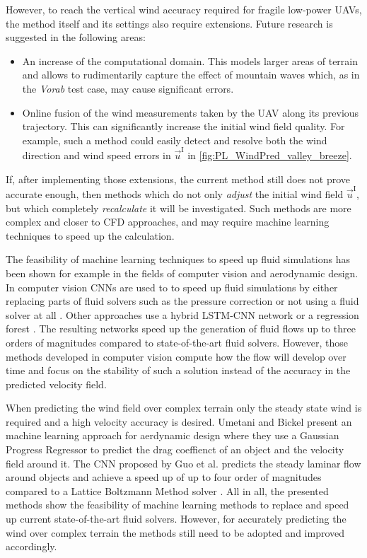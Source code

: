 \documentclass[twocolumn,letterpaper]{IEEEAerospaceCLS}
\begin{document}
However, to reach the vertical wind accuracy required for fragile low-power UAVs, the method itself and its settings also require extensions. Future research is suggested in the following areas: 
\begin{itemize}
\item An increase of the computational domain. This models larger areas of terrain and allows to rudimentarily capture the effect of mountain waves which, as in the \emph{Vorab} test case, may cause significant errors.
\item Online fusion of the wind measurements taken by the UAV along its previous trajectory. This can significantly increase the initial wind field quality. For example, such a method could easily detect and resolve both the wind direction and wind speed errors in $\vec{u}^\text{I}$ in \cref{fig:PL_WindPred_valley_breeze}.
\end{itemize}

If, after implementing those extensions, the current method still does not prove accurate enough, then methods which do not only \emph{adjust} the initial wind field $\vec{u}^\text{I}$, but which completely \emph{recalculate} it will be investigated. Such methods are more complex and closer to \ac{CFD} approaches, and may require machine learning techniques to speed up the calculation.

The feasibility of machine learning techniques to speed up fluid simulations has been shown for example in the fields of computer vision and aerodynamic design. In computer vision \acp{CNN} are used to to speed up fluid simulations by either replacing parts of fluid solvers such as the pressure correction \cite{Tompson2017AEF} or not using a fluid solver at all \cite{Kim2018DeepFluids}. Other approaches use a hybrid LSTM-\ac{CNN} network \cite{Wiewel2018LSP} or a regression forest \cite{Ladicky2015DFS}. The resulting networks speed up the generation of fluid flows up to three orders of magnitudes compared to state-of-the-art fluid solvers. However, those methods developed in computer vision compute how the flow will develop over time and focus on the stability of such a solution instead of the accuracy in the predicted velocity field.

When predicting the wind field over complex terrain only the steady state wind is required and a high velocity accuracy is desired. Umetani and Bickel \cite{Umetani2018LTF} present an machine learning approach for aerdynamic design where they use a Gaussian Progress Regressor to predict the drag coeffienct of an object and the velocity field around it. The \ac{CNN} proposed by Guo et al. \cite{Guo2016CNN} predicts the steady laminar flow around objects and achieve a speed up of up to four order of magnitudes compared to a Lattice Boltzmann Method solver \cite{McNamara1988LBM}. All in all, the presented methods show the feasibility of machine learning methods to replace and speed up current state-of-the-art fluid solvers. However, for accurately predicting the wind over complex terrain the methods still need to be adopted and improved accordingly.
\end{document}
